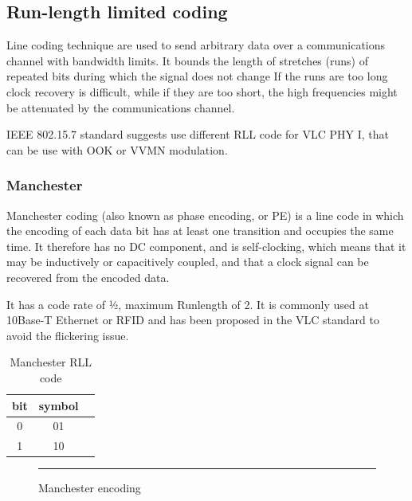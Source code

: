 \subsection{Run-length limited coding} \label{rll}

Line coding technique are used to send arbitrary data over a communications channel with bandwidth
limits.
It bounds the length of stretches (runs) of repeated bits during which the signal does not change
If the runs are too long clock recovery is difficult, while if they are too short, the high frequencies
might be attenuated by the communications channel.

IEEE 802.15.7 standard suggests use different RLL code for VLC PHY I, that can be use with OOK or VVMN modulation.
\subsubsection{Manchester}

Manchester coding (also known as phase encoding, or PE) is a line code in which the encoding of each data bit has at least one transition and occupies the same time. It therefore has no DC component, and is self-clocking, which means that it may be inductively or capacitively coupled, and that a clock signal can be recovered from the encoded data.

It has a code rate of 1⁄2, maximum Runlength of 2.
It is commonly used at 10Base-T Ethernet or RFID and has been proposed in the VLC standard to avoid the flickering issue.
\begin{table}[htbp]
\begin{center}
\begin{tabular}{|c|c|r|}
  \hline
 bit & symbol \\
  \hline
  0 & 01 \\
  1 & 10 \\
  \hline
\end{tabular}
\end{center}
\caption{Manchester RLL code}
\label{tab:manchester}
\end{table}

\begin{figure}[htbp]
  \centering
    \rule{35em}{0.5pt}
  \caption[Manchester encoding]{Manchester encoding}
  \label{fig:manchester}
\end{figure}

